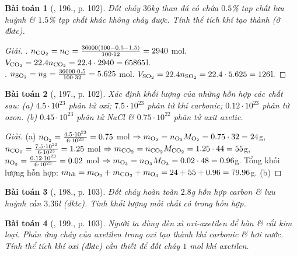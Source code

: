 \documentclass{article}
\newtheorem{baitoan}{Bài toán}
\begin{document}
\begin{baitoan}[\cite{An_400_BT_Hoa_Hoc_8_2020}, 196., p. 102]
	Đốt cháy $36$\emph{kg} than đá có chứa $0.5$\% tạp chất lưu huỳnh \& $1.5$\% tạp chất khác không cháy được. Tính thể tích khí \emph{} tạo thành (ở đktc).
\end{baitoan}

\begin{proof}[Giải]
	. $n_{\rm CO_2} = n_{\rm C} = \frac{36000(100 - 0.5 - 1.5)}{100\cdot12} = 2940$ mol. $V_{\rm CO_2} = 22.4n_{\rm CO_2} = 22.4\cdot2940 = 65865$l.\\. $n_{\rm SO_2} = n_{\rm S} = \frac{36000\cdot0.5}{100\cdot32} = 5.625$ mol. $V_{\rm SO_2} = 22.4n_{\rm SO_2} = 22.4\cdot5.625 = 126$l.
\end{proof}

\begin{baitoan}[\cite{An_400_BT_Hoa_Hoc_8_2020}, 197., p. 102]
	Xác định khối lượng của những hỗn hợp các chất sau: (a) $4.5\cdot10^{23}$ phân tử oxi; $7.5\cdot10^{23}$ phân tử khí carbonic; $0.12\cdot10^{23}$ phân tử ozon. (b) $0.45\cdot10^{23}$ phân tử \emph{NaCl} \& $0.75\cdot10^{22}$ phân tử \emph{} axit axetic.
\end{baitoan}

\begin{proof}[Giải]
	(a) $n_{\rm O_2} = \frac{4.5\cdot10^{23}}{6\cdot10^{23}} = 0.75$ mol $\Rightarrow m_{\rm O_2} = n_{\rm O_2}M_{\rm O_2} = 0.75\cdot32 = 24$g, $n_{\rm CO_2} = \frac{7.5\cdot10^{23}}{6\cdot10^{23}} = 1.25$ mol $\Rightarrow m_{\rm CO_2} = n_{\rm CO_2}M_{\rm CO_2} = 1.25\cdot44 = 55$g, $n_{\rm O_3} = \frac{0.12\cdot10^{23}}{6\cdot10^{23}} = 0.02$ mol $\Rightarrow m_{\rm O_3} = n_{\rm O_3}M_{\rm O_3} = 0.02\cdot48 = 0.96$g. Tổng khối lượng hỗn hợp: $m_{\rm hh} = m_{\rm O_2} + m_{\rm CO_2} + m_{\rm O_3} = 24 + 55 + 0.96 = 79.96$g. (b) 
\end{proof}

\begin{baitoan}[\cite{An_400_BT_Hoa_Hoc_8_2020}, 198., p. 103]
	Đốt cháy hoàn toàn $2.8$\emph{g} hỗn hợp carbon \& lưu huỳnh cần $3.36$\emph{l} \emph{} (đktc). Tính khối lượng mỗi chất có trong hỗn hợp.
\end{baitoan}

\begin{baitoan}[\cite{An_400_BT_Hoa_Hoc_8_2020}, 199., p. 103]
	Người ta dùng đèn xì oxi-axetilen để hàn \& cắt kim loại. Phản ứng cháy của axetilen \emph{} trong oxi tạo thành khí carbonic \& hơi nước. Tính thể tích khí oxi (đktc) cần thiết để đốt cháy $1$ \emph{mol} khí axetilen.
\end{baitoan}
\end{document}
